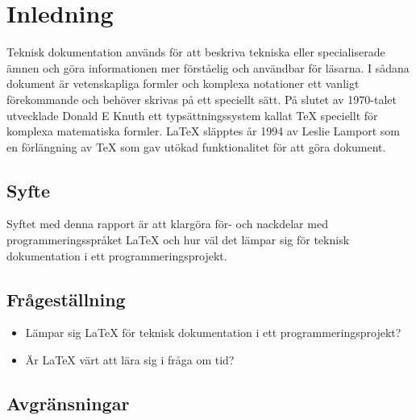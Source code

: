 \section{Inledning}
Teknisk dokumentation används för att beskriva tekniska eller specialiserade ämnen och göra informationen mer förståelig och användbar för läsarna. I sådana dokument är vetenskapliga formler och komplexa notationer ett vanligt förekommande och behöver skrivas på ett speciellt sätt. 
\newline
\newline
På slutet av 1970-talet utvecklade Donald E Knuth ett typsättningssystem kallat {\TeX} speciellt för komplexa matematiska formler. {\LaTeX} släpptes år 1994 av Leslie Lamport som en förlängning av {\TeX} som gav utökad funktionalitet för att göra dokument. \citep{latexandfriends}  

\subsection{Syfte}
Syftet med denna rapport är att klargöra för- och nackdelar med programmeringsspråket {\LaTeX} och hur väl det lämpar sig för teknisk dokumentation i ett programmeringsprojekt. 

\subsection{Frågeställning}
\begin{itemize}
\item Lämpar sig {\LaTeX} för teknisk dokumentation i ett programmeringsprojekt? 
\item Är {\LaTeX} värt att lära sig i fråga om tid?
\end{itemize}
		
\subsection{Avgränsningar}


	